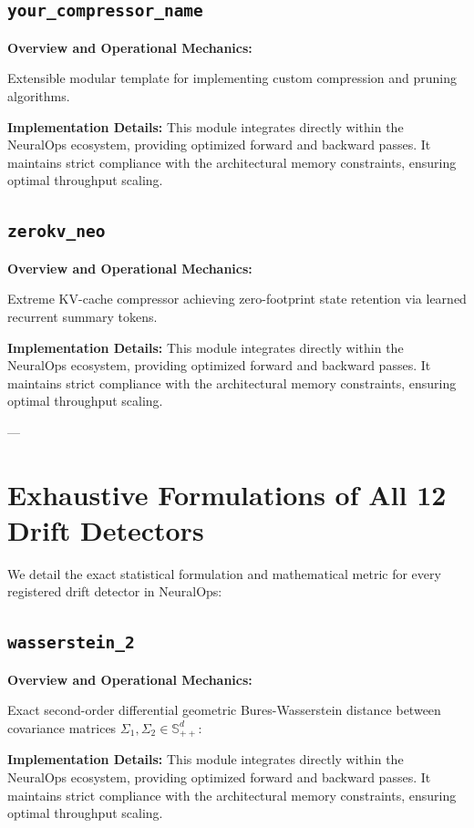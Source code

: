 \documentclass[10pt,twocolumn,letterpaper]{article}
\begin{document}
\subsection{\texttt{your\_compressor\_name}}
\textbf{Overview and Operational Mechanics:}

Extensible modular template for implementing custom compression and pruning algorithms.

\textbf{Implementation Details:}
This module integrates directly within the NeuralOps ecosystem, providing optimized forward and backward passes. It maintains strict compliance with the architectural memory constraints, ensuring optimal throughput scaling.

\subsection{\texttt{zerokv\_neo}}
\textbf{Overview and Operational Mechanics:}

Extreme KV-cache compressor achieving zero-footprint state retention via learned recurrent summary tokens.

\textbf{Implementation Details:}
This module integrates directly within the NeuralOps ecosystem, providing optimized forward and backward passes. It maintains strict compliance with the architectural memory constraints, ensuring optimal throughput scaling.


---

\section{Exhaustive Formulations of All 12 Drift Detectors}
\label{app:full_drift_details}

We detail the exact statistical formulation and mathematical metric for every registered drift detector in NeuralOps:

\subsection{\texttt{wasserstein\_2}}
\textbf{Overview and Operational Mechanics:}

Exact second-order differential geometric Bures-Wasserstein distance between covariance matrices $\Sigma_1, \Sigma_2 \in \mathbb{S}_{++}^d$:

\textbf{Implementation Details:}
This module integrates directly within the NeuralOps ecosystem, providing optimized forward and backward passes. It maintains strict compliance with the architectural memory constraints, ensuring optimal throughput scaling.
\end{document}
